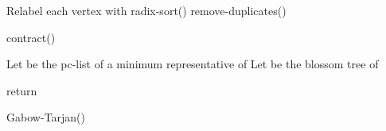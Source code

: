 \documentclass{llncs}
\begin{document}
\begin{algorithm}\label{alg:contract}

Relabel each vertex  with \;
 radix-sort()\;
 remove-duplicates()\;
\caption{contract()}
\end{algorithm}

\begin{algorithm}
Let  be the pc-list of a minimum representative of \;
Let  be the blossom tree of \;
\;
\;
\;

return \;


\caption{Gabow-Tarjan()}
\end{algorithm}

\begin{comment}
\begin{algorithm}
\;
\;
\While{x has a neighbor }{
	\If{ is free}
	{
		exit;
	}
	\Else{
	\;
	\emph{find\_ap(y')}\;
	}
}
\Else{
	\While{ has a neighbor }{
			 inner vertices along  in reverse order\;
			\For{ such that }{
				\;	
			}		
			\For{}{
				\;
				\emph{find\_ap(i)}\;
		}
	}
}
return \;
\caption{\emph{find\_ap}()}
\end{algorithm}
\end{comment}
\end{document}
